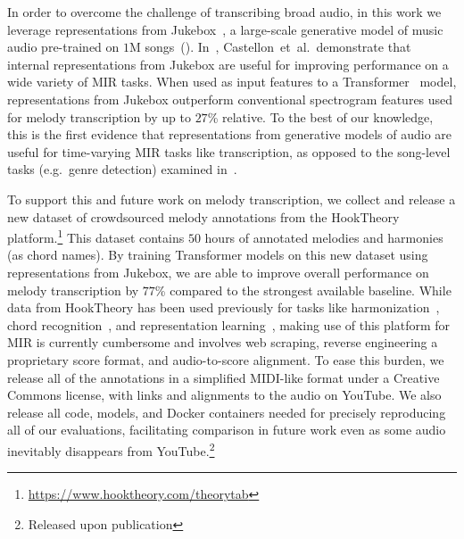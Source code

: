 \documentclass{article}
\newcommand{\hooktheory}{HookTheory}
\begin{document}
In order to overcome the challenge of transcribing broad audio, in this work we leverage representations from Jukebox~\cite{dhariwal2020jukebox}, a large-scale generative model of music audio pre-trained on $1$M songs~(). 
In~\cite{castellon2021calm}, Castellon~et~al.\ demonstrate that internal representations from Jukebox are useful for improving performance on a wide variety of MIR tasks. 
When used as input features to a Transformer~\cite{vaswani2017attention} model, representations from Jukebox outperform conventional spectrogram features used for melody transcription by 
up to $27$\% relative. 
To the best of our knowledge, this is the first evidence that representations from generative models of audio are useful for time-varying MIR tasks like transcription, as opposed to the song-level tasks (e.g.~genre detection) examined in~\cite{castellon2021calm}. 

To support this and future work on melody transcription, we collect and release a new dataset of crowdsourced melody annotations from the \hooktheory{} platform.\footnote{\url{https://www.hooktheory.com/theorytab}} 
This dataset contains $50$ hours of annotated melodies and harmonies (as chord names).  %
By training Transformer models on this new dataset using representations from Jukebox, we are able to improve overall performance on melody transcription by 
$77$\% 
compared to the strongest available baseline. 
While data from \hooktheory{} has been used previously for tasks like harmonization~\cite{chen2021surprisenet,yeh2021automatic}, chord recognition~\cite{jiang2019mirex}, and representation learning~\cite{jiang2020transformer}, making use of this platform for MIR is currently cumbersome and involves web scraping, reverse engineering a proprietary score format, and audio-to-score alignment. 
To ease this burden, we release all of the annotations in a simplified MIDI-like format under a Creative Commons license, with links and alignments to the audio on YouTube. 
We also release all code, models, and Docker containers needed for precisely reproducing all of our evaluations, facilitating comparison in future work even as some audio inevitably disappears from YouTube.\footnote{Released upon publication}
\end{document}
